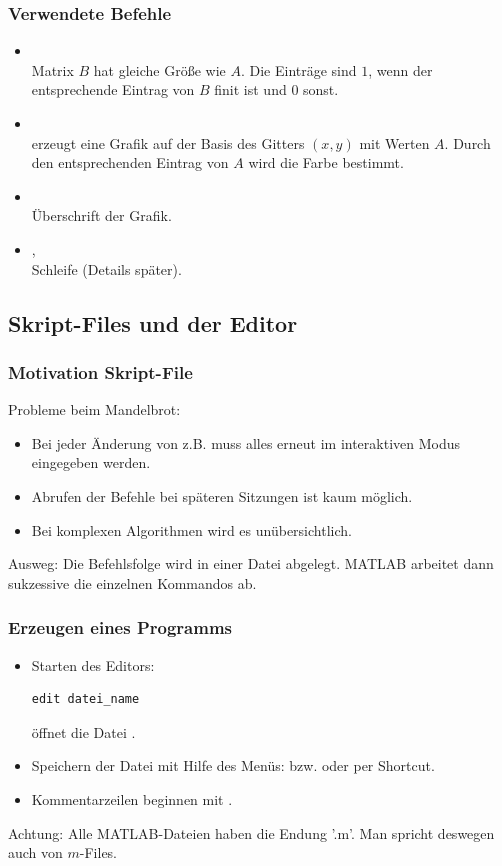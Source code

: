 \documentclass[hyperref={xetex}]{beamer}
\begin{document}
\begin{frame}[fragile]\frametitle{Verwendete Befehle}
\begin{itemize}
\item {}\\ Matrix $B$ hat gleiche Gr\"o{\ss}e wie $A$. Die Einträge sind $1$, 
wenn der entsprechende Eintrag von $B$ finit ist und $0$ sonst.  
\item {}\\ erzeugt eine Grafik auf der Basis des Gitters
  $(x,y)$ mit Werten $A$. Durch den entsprechenden Eintrag von $A$ wird die
  Farbe bestimmt.  
\item {}\\ Überschrift der Grafik.
\item {}, \\ 
Schleife (Details später).
\end{itemize}
\end{frame}

\subsection{Skript-Files und der Editor}

\begin{frame}[fragile]\frametitle{Motivation Skript-File}
\alert{Probleme beim Mandelbrot:} 
\begin{itemize}
\item
Bei jeder Änderung von z.B.  muss alles erneut im
interaktiven Modus eingegeben werden.
\item 
Abrufen der Befehle bei späteren Sitzungen ist kaum möglich. 
\item Bei komplexen Algorithmen wird es unübersichtlich.
\end{itemize}
\alert{Ausweg:} Die Befehlsfolge wird in einer Datei
abgelegt. MATLAB arbeitet dann sukzessive die einzelnen Kommandos
ab. 
\end{frame}

\begin{frame}[fragile]\frametitle{Erzeugen eines Programms}
\begin{itemize}
\item Starten des Editors: 
\begin{lstlisting}
edit datei_name 
\end{lstlisting}
öffnet die Datei .
\item Speichern der Datei mit Hilfe des Menüs: 
  bzw.  oder per Shortcut.
\item Kommentarzeilen beginnen mit \mcode{\%}.
\end{itemize}
\alert{Achtung:} Alle MATLAB-Dateien haben die Endung '.m'. Man
spricht deswegen auch von $m$-Files.
\end{frame}
\end{document}

